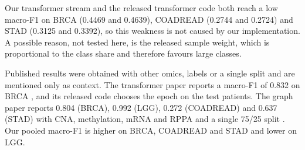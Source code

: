 \documentclass[conference]{IEEEtran}
\begin{document}
Our transformer stream and the released transformer code both reach a low macro-F1 on BRCA (0.4469 and 0.4639),
COADREAD (0.2744 and 0.2724) and STAD (0.3125 and 0.3392), so this weakness is not caused by our implementation. A
possible reason, not tested here, is the released sample weight, which is proportional to the class share and therefore
favours large classes.

Published results were obtained with other omics, labels or a single split and are mentioned only as context. The
transformer paper reports a macro-F1 of 0.832 on BRCA \cite{meng2026motcs}, and its released code chooses the epoch on
the test patients. The graph paper reports 0.804 (BRCA), 0.992 (LGG), 0.272 (COADREAD) and 0.637 (STAD) with CNA,
methylation, mRNA and RPPA and a single 75/25 split \cite{dou2025mogcan}. Our pooled macro-F1 is higher on BRCA,
COADREAD and STAD and lower on LGG.
\end{document}
